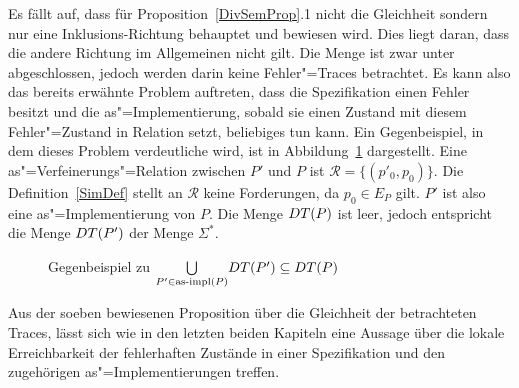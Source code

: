 Es fällt auf, dass für Proposition~\ref{DivSemProp}.1 nicht die Gleichheit
sondern nur eine Inklusions-Richtung behauptet und bewiesen wird. Dies liegt
daran, dass die andere Richtung im Allgemeinen nicht gilt. Die Menge \DT{} ist
zwar unter \cont{} abgeschlossen, jedoch werden darin keine Fehler"=Traces
betrachtet. Es kann also das bereits erwähnte Problem auftreten, dass die
Spezifikation einen Fehler besitzt und die as"=Implementierung, sobald sie
einen Zustand mit diesem Fehler"=Zustand in Relation setzt, beliebiges tun
kann. Ein Gegenbeispiel, in dem dieses Problem verdeutliche wird, ist in
Abbildung~\ref{DTAsimpInDTGegenBsp} dargestellt. Eine
as"=Verfeinerungs"=Relation zwischen $P'$ und $P$ ist $\mathcal{R} =
\{(p'_0,p_0)\}$. Die Definition~\ref{SimDef} stellt an $\mathcal{R}$ keine
Forderungen, da $p_0\in E_P$ gilt. $P'$ ist also eine as"=Implementierung von
$P$. Die Menge $DT (P)$ ist leer, jedoch entspricht die Menge $DT (P')$ der
Menge $\Sigma ^*$.

\begin{figure}[htbp]
  \begin{center}
    \caption{Gegenbeispiel zu $\underset{P'\in\mathrm{as}\text{-}\mathrm{impl} (P)}{\bigcup} DT (P')
    \subseteq DT (P)$}
    \label{DTAsimpInDTGegenBsp}
  \end{center}
\end{figure}

Aus der soeben bewiesenen Proposition über die Gleichheit der betrachteten
Traces, lässt sich wie in den letzten beiden Kapiteln eine Aussage über die
lokale Erreichbarkeit der fehlerhaften Zustände in einer Spezifikation und den
zugehörigen as"=Implementierungen treffen.

